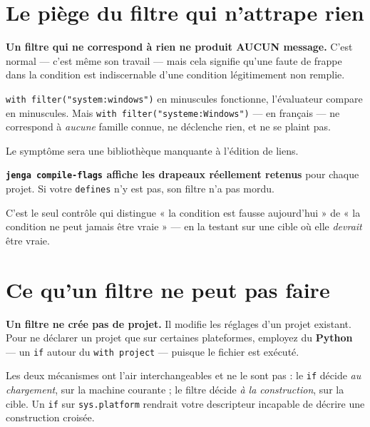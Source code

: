 \section{Le piège du filtre qui n'attrape rien}

\begin{nkpiege}
\textbf{Un filtre qui ne correspond à rien ne produit AUCUN message.} C'est
normal --- c'est même son travail --- mais cela signifie qu'une faute de frappe
dans la condition est indiscernable d'une condition légitimement non remplie.

\texttt{with filter("system:windows")} en minuscules fonctionne, l'évaluateur
compare en minuscules. Mais \texttt{with filter("systeme:Windows")} --- en
français --- ne correspond à \emph{aucune} famille connue, ne déclenche rien, et
ne se plaint pas.

Le symptôme sera une bibliothèque manquante à l'édition de liens.
\end{nkpiege}

\begin{nkretenir}
\textbf{\texttt{jenga compile-flags} affiche les drapeaux réellement retenus}
pour chaque projet. Si votre \texttt{defines} n'y est pas, son filtre n'a pas
mordu.

C'est le seul contrôle qui distingue « la condition est fausse aujourd'hui » de
« la condition ne peut jamais être vraie » --- en la testant sur une cible où
elle \emph{devrait} être vraie.
\end{nkretenir}

\section{Ce qu'un filtre ne peut pas faire}

\begin{nkretenir}
\textbf{Un filtre ne crée pas de projet.} Il modifie les réglages d'un projet
existant. Pour ne déclarer un projet que sur certaines plateformes, employez du
\textbf{Python} --- un \texttt{if} autour du \texttt{with project} --- puisque le
fichier est exécuté.

Les deux mécanismes ont l'air interchangeables et ne le sont pas : le
\texttt{if} décide \emph{au chargement}, sur la machine courante ; le filtre
décide \emph{à la construction}, sur la cible. Un \texttt{if} sur
\texttt{sys.platform} rendrait votre descripteur incapable de décrire une
construction croisée.
\end{nkretenir}

